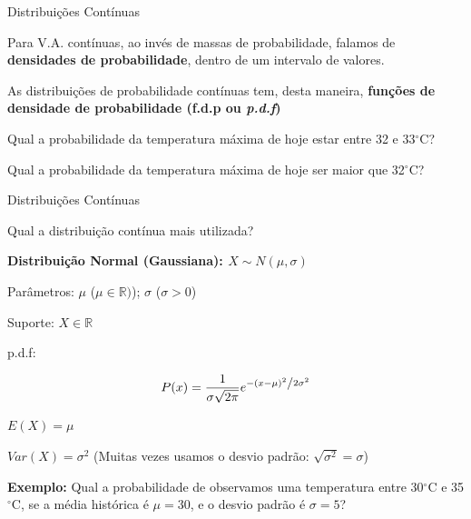 \documentclass{beamer}\usepackage[]{graphicx}\usepackage[]{color}
\begin{document}
\begin{frame}{Distribuições Contínuas}


Para V.A. contínuas, ao invés de massas de probabilidade, falamos de \textbf{densidades de probabilidade}, dentro de um intervalo de valores.

\vfill

\item As distribuições de probabilidade contínuas tem, desta maneira, \textbf{funções de densidade de probabilidade (f.d.p ou \emph{p.d.f})}

\vfill

Qual a probabilidade da temperatura máxima de hoje estar entre 32 e 33$^\circ$C?

Qual a probabilidade da temperatura máxima de hoje ser maior que 32$^\circ$C?
    
\end{frame} 

\begin{frame}{Distribuições Contínuas}

Qual a distribuição contínua mais utilizada? \pause

\vfill

\textbf{Distribuição Normal (Gaussiana): $X \sim N(\mu,\sigma)$}

\begin{footnotesize}

Parâmetros: $\mu$ ($\mu \in \mathbb{R})$); $\sigma$ ($\sigma > 0$)

Suporte: $X \in \mathbb{R}$

p.d.f:

\begin{equation*}
P(x) = \frac{1}{{\sigma \sqrt {2\pi } }}e^{{{ - \left( {x - \mu } \right)^2 } \mathord{\left/ {\vphantom {{ - \left( {x - \mu } \right)^2 } {2\sigma ^2 }}} \right. \kern-\nulldelimiterspace} {2\sigma ^2 }}}
\end{equation*}

$E(X) = \mu$

$Var(X) = \sigma^2$ (Muitas vezes usamos o desvio padrão: $\sqrt{\sigma^2} = \sigma$)



\alert{\textbf{Exemplo:}} Qual a probabilidade de observamos uma temperatura entre 30$^\circ$C e 35$^\circ$C, se a média histórica é $\mu = 30$, e o desvio padrão é $\sigma = 5$?

\end{footnotesize}
    
\end{frame} 
\end{document}
